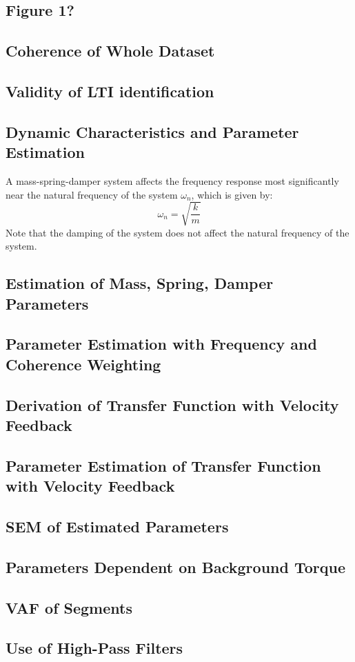 \documentclass[11pt,a4paper]{article}
\begin{document}
\subsection{Figure 1?}

\subsection{Coherence of Whole Dataset}

\subsection{Validity of LTI identification}

\subsection{Dynamic Characteristics and Parameter Estimation}
A mass-spring-damper system affects the frequency response most significantly
near the natural frequency of the system $\omega_n$, which is given by:
\begin{equation}
    \omega_n = \sqrt{\frac{k}{m}}
\end{equation}
Note that the damping of the system does not affect the natural frequency of
the system.

\subsection{Estimation of Mass, Spring, Damper Parameters}

\subsection{Parameter Estimation with Frequency and Coherence Weighting}

\subsection{Derivation of Transfer Function with Velocity Feedback}

\subsection{Parameter Estimation of Transfer Function with Velocity Feedback}

\subsection{SEM of Estimated Parameters}

\subsection{Parameters Dependent on Background Torque}

\subsection{VAF of Segments}

\subsection{Use of High-Pass Filters}
\end{document}

